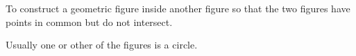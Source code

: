 To construct a geometric figure inside another figure  so that the two 
figures have points in common but do not intersect.
\par
Usually one or other of the figures is a circle.